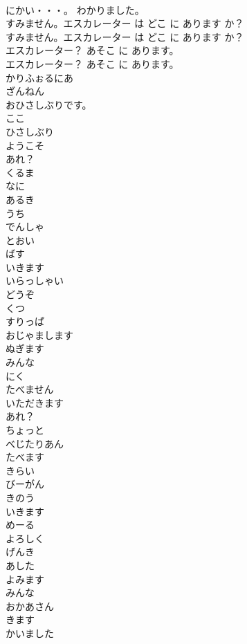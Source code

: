 \documentclass[8pt]{extreport}
\begin{document}
\begin{CJK}{UTF8}{min}
\\	にかい・・・。 わかりました。 
\\	すみません。エスカレーター は どこ に あります か？	
\\	すみません。エスカレーター は どこ に あります か？ 
\\	エスカレーター？ あそこ に あります。	
\\	エスカレーター？ あそこ に あります。 
\\	かりふぉるにあ
\\	ざんねん
\\	おひさしぶりです。
\\	ここ
\\	ひさしぶり
\\	ようこそ
\\	あれ？
\\	くるま
\\	なに
\\	あるき
\\	うち
\\	でんしゃ
\\	とおい
\\	ばす
\\	いきます
\\	いらっしゃい
\\	どうぞ
\\	くつ
\\	すりっぱ
\\	おじゃまします
\\	ぬぎます
\\	みんな
\\	にく
\\	たべません
\\	いただきます
\\	あれ？
\\	ちょっと
\\	べじたりあん
\\	たべます
\\	きらい
\\	びーがん
\\	きのう
\\	いきます
\\	めーる
\\	よろしく
\\	げんき
\\	あした
\\	よみます
\\	みんな
\\	おかあさん
\\	きます
\\	かいました

\end{CJK}
\end{document}
